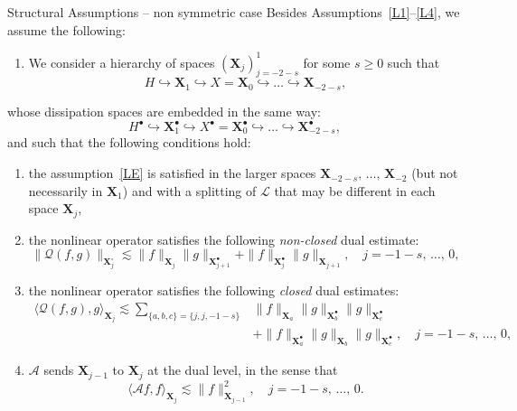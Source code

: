 \documentclass[AHL,Unicode,longabstracts,published]{cedram}
\renewcommand{\AA}{\mathcal{A}}
\newcommand{\LL}{\mathcal{L}}
\newcommand{\QQ}{\mathcal{Q}}
\newcommand{\Ss}{H}
\newcommand{\Ssp}{H^{\bullet}}
\newcommand{\Sl}{X}
\newcommand{\Slp}{X^{\bullet}}
\newcommand{\Sh}{\bm{X}}
\newcommand{\Shp}{\bm{X}^{\bullet}}
\newcommand{\Shm}{\bm{X}^{\circ}}
\renewcommand*\ge{\geqslant}
\newcommand{\hypst}[1]{\textnormal{\textbf{#1}}}
\newcommand{\la}{\langle}
\newcommand{\ra}{\rangle}
\newcommand*{\relabel}{\renewcommand{\labelenumi}{(\theenumi)}}
\newcommand*{\alphenumi}{\renewcommand*{\theenumi}{\alph{enumi}}\relabel}
\begin{document}
\begin{enonce*}
{Structural Assumptions -- non symmetric case}
Besides Assumptions~\eqref{L1}--\eqref{L4}, we assume the following:
\begin{enumerate}[label=\hypst{BED}]
\item \label{BED}
We consider a hierarchy of spaces $(\Sh_j)_{j=-2-s}^1$ for some $s \ge 0$ such that
\[
\Ss \hookrightarrow \Sh_1 \hookrightarrow \Sl = \Sh_{0} \hookrightarrow \dots \hookrightarrow \Sh_{-2-s},
\]
\end{enumerate}
whose dissipation spaces are embedded in the same way:
\[
\Ssp \hookrightarrow \Shp_1 \hookrightarrow \Slp = \Shp_{0} \hookrightarrow \dots \hookrightarrow \Shp_{-2-s},
\]
and such that the following conditions hold:
\begin{enumerate}\alphenumi
\item the assumption~\eqref{LE} is satisfied in the larger spaces $\Sh_{-2-s},\,\dots,\,\Sh_{-2}$ (but not necessarily in $\Sh_1$) and with a splitting of $\LL$ that may be different in each space $\Sh_j$,
\item the nonlinear operator satisfies the following \emph{non-closed} dual estimate:
\begin{equation}\label{eq:BEDNon}
\| \QQ(f, g) \|_{\Shm_{j} }
\lesssim
\| f \|_{\Sh_{j}} \| g \|_{\Shp_{j+1}} + \| f \|_{\Shp_{j}} \| g \|_{\Sh_{j+1}}, \quad j=-1-s,\,\dots,\,0,
\end{equation}
\item the nonlinear operator satisfies the following \emph{closed} dual estimates:
\begin{equation}\label{eq:BEDclosed}
\begin{split}
\la \QQ(f, g), g \ra_{ \Sh_{j} }
\lesssim \sum_{ \{ a, b, c \} = \{j, j, -1-s \} } & \| f \|_{\Sh_{ a }} \| g \|_{\Shp_{b}} \| g \|_{\Shp_{c}} \\
& + \| f \|_{\Shp_{a}} \| g \|_{\Sh_{b}} \| g \|_{\Shp_{c}}, \quad j = -1-s,\,\dots,\,0,
\end{split}
\end{equation}
\item $\AA$ sends $\Sh_{j-1}$ to $\Sh_{j}$ at the dual level, in the sense that
\[
\la \AA f, f \ra_{\Sh_{j}} \lesssim \| f \|^2_{ \Sh_{j-1} }, \quad j=-1-s,\,\dots,\,0.
\]
\end{enumerate}
\end{enonce*}
\end{document}
